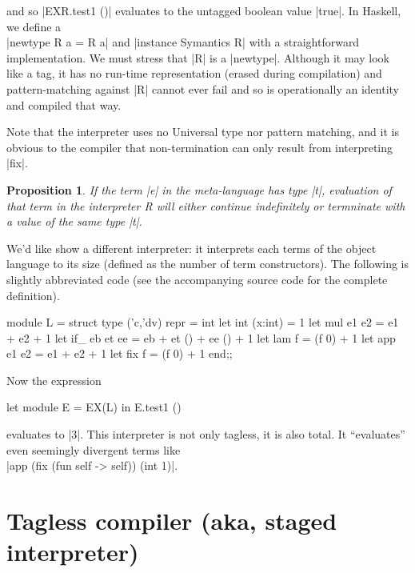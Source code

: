 \documentclass[preprint]{sigplanconf}
\newtheorem{prop}{Proposition}
\begin{document}
\noindent and so |EXR.test1 ()| evaluates to the untagged boolean value |true|.
In Haskell, we define a\\
|newtype R a = R a| and |instance Symantics R|
with a straightforward implementation. We must stress that |R| is
a |newtype|. Although it may look like a tag, it has no run-time
representation (erased during compilation) and pattern-matching
against |R| cannot ever fail and so is operationally an identity and
compiled that way.

Note that the interpreter uses no Universal type nor pattern
matching, and it is obvious to the compiler that non-termination can
only result from interpreting |fix|.

\begin{prop}
If the term |e| in the meta-language has type
|t|, evaluation of that term in the interpreter R will either continue
indefinitely or termninate with a value of the same type |t|.
\end{prop}

We'd like show a different interpreter: it interprets each terms of
the object language to its size (defined as the number of term
constructors). The following is slightly abbreviated code (see the
accompanying source code for the complete definition).
 
\begin{code}
module L = struct
  type ('c,'dv) repr = int
  let int (x:int)  = 1
  let mul e1 e2    = e1 + e2 + 1
  let if_ eb et ee = eb + et () + ee () + 1
  let lam f        = (f 0) + 1
  let app e1 e2    = e1 + e2 + 1
  let fix f        = (f 0) + 1
end;;
\end{code}

\noindent Now the expression
\begin{code}
  let module E = EX(L) in E.test1 ()
\end{code}
evaluates to |3|. This interpreter is not only tagless, it is also
total. It ``evaluates'' even seemingly divergent terms like\\
|app (fix (fun self -> self)) (int 1)|.

\begin{comment}
module EX1(S: Symantics) = struct
 open S
 let tfix () = app (fix (fun self -> self)) (int 1)
end;;
let module E =EX1(R) in E.tfix ();;
let module E =EX1(L) in E.tfix ();;
\end{comment}

\section{Tagless compiler (aka, staged interpreter)}\label{compiler}
\end{document}
